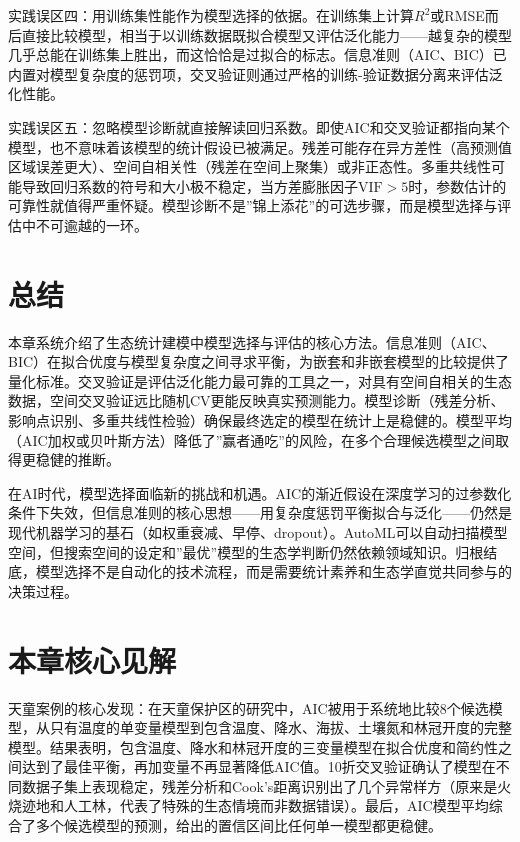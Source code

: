 \documentclass[
  twoside,12pt,fontset=none]{ctexbook}
\begin{document}
实践误区四：用训练集性能作为模型选择的依据。在训练集上计算\(R^2\)或RMSE而后直接比较模型，相当于以训练数据既拟合模型又评估泛化能力------越复杂的模型几乎总能在训练集上胜出，而这恰恰是过拟合的标志。信息准则（AIC、BIC）已内置对模型复杂度的惩罚项，交叉验证则通过严格的训练-验证数据分离来评估泛化性能。

实践误区五：忽略模型诊断就直接解读回归系数。即使AIC和交叉验证都指向某个模型，也不意味着该模型的统计假设已被满足。残差可能存在异方差性（高预测值区域误差更大）、空间自相关性（残差在空间上聚集）或非正态性。多重共线性可能导致回归系数的符号和大小极不稳定，当方差膨胀因子\(\text{VIF} > 5\)时，参数估计的可靠性就值得严重怀疑。模型诊断不是''锦上添花''的可选步骤，而是模型选择与评估中不可逾越的一环。

\hypertarget{ux603bux7ed3-8}{%
\section{总结}\label{ux603bux7ed3-8}}

本章系统介绍了生态统计建模中模型选择与评估的核心方法。信息准则（AIC、BIC）在拟合优度与模型复杂度之间寻求平衡，为嵌套和非嵌套模型的比较提供了量化标准。交叉验证是评估泛化能力最可靠的工具之一，对具有空间自相关的生态数据，空间交叉验证远比随机CV更能反映真实预测能力。模型诊断（残差分析、影响点识别、多重共线性检验）确保最终选定的模型在统计上是稳健的。模型平均（AIC加权或贝叶斯方法）降低了''赢者通吃''的风险，在多个合理候选模型之间取得更稳健的推断。

在AI时代，模型选择面临新的挑战和机遇。AIC的渐近假设在深度学习的过参数化条件下失效，但信息准则的核心思想------用复杂度惩罚平衡拟合与泛化------仍然是现代机器学习的基石（如权重衰减、早停、dropout）。AutoML可以自动扫描模型空间，但搜索空间的设定和''最优''模型的生态学判断仍然依赖领域知识。归根结底，模型选择不是自动化的技术流程，而是需要统计素养和生态学直觉共同参与的决策过程。

\hypertarget{ux672cux7ae0ux6838ux5fc3ux89c1ux89e3-7}{%
\section{本章核心见解}\label{ux672cux7ae0ux6838ux5fc3ux89c1ux89e3-7}}

天童案例的核心发现：在天童保护区的研究中，AIC被用于系统地比较8个候选模型，从只有温度的单变量模型到包含温度、降水、海拔、土壤氮和林冠开度的完整模型。结果表明，包含温度、降水和林冠开度的三变量模型在拟合优度和简约性之间达到了最佳平衡，再加变量不再显著降低AIC值。10折交叉验证确认了模型在不同数据子集上表现稳定，残差分析和Cook's距离识别出了几个异常样方（原来是火烧迹地和人工林，代表了特殊的生态情境而非数据错误）。最后，AIC模型平均综合了多个候选模型的预测，给出的置信区间比任何单一模型都更稳健。
\end{document}
